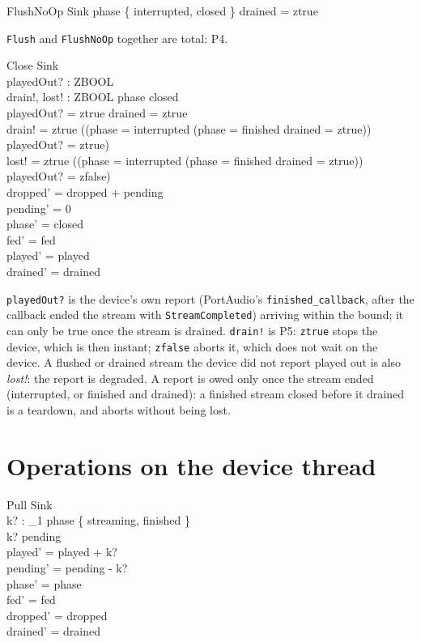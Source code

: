 \documentclass[a4paper,10pt,fleqn]{article}
\begin{document}
\begin{schema}{FlushNoOp}
  \Xi Sink
\where
  phase \in \{ interrupted, closed \} \lor drained = ztrue
\end{schema}

\texttt{Flush} and \texttt{FlushNoOp} together are total: P4.

\begin{schema}{Close}
  \Delta Sink \\
  playedOut? : ZBOOL \\
  drain!, lost! : ZBOOL
\where
  phase \neq closed \\
  playedOut? = ztrue \implies drained = ztrue \\
  drain! = ztrue \iff
    ((phase = interrupted \lor (phase = finished \land drained = ztrue))
      \land playedOut? = ztrue) \\
  lost! = ztrue \iff
    ((phase = interrupted \lor (phase = finished \land drained = ztrue))
      \land playedOut? = zfalse) \\
  dropped' = dropped + pending \\
  pending' = 0 \\
  phase' = closed \\
  fed' = fed \\
  played' = played \\
  drained' = drained
\end{schema}

\texttt{playedOut?} is the device's own report (PortAudio's
\texttt{finished\_callback}, after the callback ended the stream with
\texttt{StreamCompleted}) arriving within the bound; it can only be true once
the stream is drained. \texttt{drain!} is P5: \texttt{ztrue} stops the
device, which is then instant; \texttt{zfalse} aborts it, which does not wait
on the device. A flushed or drained stream the device did not report played
out is also \emph{lost!}: the report is degraded. A report is owed only
once the stream ended (interrupted, or finished and drained): a finished
stream closed before it drained is a teardown, and aborts without being lost.

\section{Operations on the device thread}

\begin{schema}{Pull}
  \Delta Sink \\
  k? : \nat_1
\where
  phase \in \{ streaming, finished \} \\
  k? \leq pending \\
  played' = played + k? \\
  pending' = pending - k? \\
  phase' = phase \\
  fed' = fed \\
  dropped' = dropped \\
  drained' = drained
\end{schema}
\end{document}
